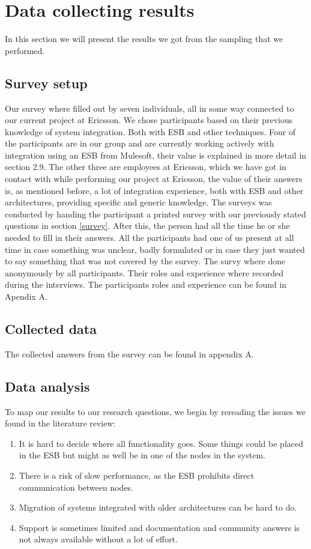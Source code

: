 \documentclass{llncs}
\begin{document}
\section{Data collecting results}
In this section we will present the results we got from the sampling that we performed.
\subsection{Survey setup}

Our survey where filled out by seven individuals, all in some way connected to our current project at Ericsson. We chose participants based on their previous knowledge of system integration. Both with ESB and other techniques. Four of the participants are in our group and are currently working actively with integration using an ESB from Mulesoft, their value is explained in more detail in section 2.9. The other three are employees at Ericsson, which we have got in contact with while performing our project at Ericsson, the value of their answers is, as mentioned before, a lot of integration experience, both with ESB and other architectures, providing specific and generic knowledge.
The surveys was conducted by handing the participant a printed survey with our previously stated questions  in section \ref{survey}. After this, the person had all the time he or she needed to fill in their answers.
All the participants had one of us present at all time in case something was unclear, badly formulated or in case they just wanted to say something that was not covered by the survey. The survy where done anonymously by all participants. Their roles and experience where recorded during the interviews. The participants roles and experience can be found in Apendix A.

\subsection{Collected data}
The collected answers from the survey can be found in appendix A.

\subsection{Data analysis}

To map our results to our research questions, we begin by rereading the issues we found in the literature review:

\begin{enumerate}
\item It is hard to decide where all functionality goes. Some things could be placed in the ESB but might as well be in one of the nodes in the system.
\item There is a risk of slow performance, as the ESB prohibits direct communication between nodes.
\item Migration of systems integrated with older architectures can be hard to do.
\item Support is sometimes limited and documentation and community answers is not always available without a lot of effort.
\end{enumerate}
\end{document}
